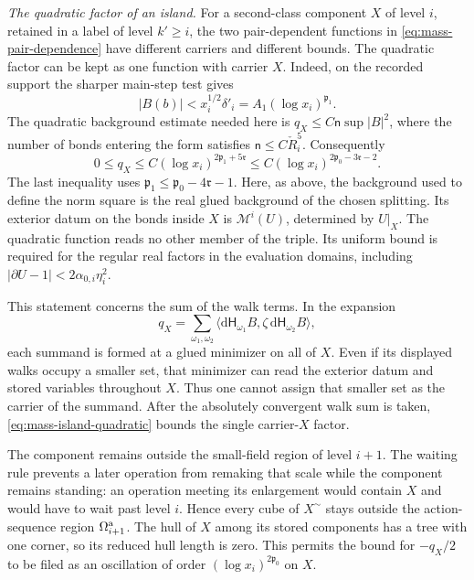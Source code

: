 \documentclass[11pt,letterpaper,reqno]{amsart}
\theoremstyle{definition}
\theoremstyle{remark}
\begin{document}
\emph{The quadratic factor of an island.}
For a second-class component \(X\) of level \(i\), retained in a
label of level \(k'\ge i\), the two pair-dependent functions in
\eqref{eq:mass-pair-dependence} have different carriers and different
bounds. The quadratic factor can be kept as one function with carrier
\(X\). Indeed, on the recorded support the sharper main-step test gives
\[
 |B(b)|<x_i^{1/2}\delta'_i
                  =A_1(\log x_i)^{\mathfrak p_1}.
\]
The quadratic background estimate needed here is
\(q_X\le C\mathsf n\sup|B|^2\), where the number of bonds entering
the form satisfies \(\mathsf n\le C\check R_i^5\). Consequently
\begin{equation}\label{eq:mass-island-quadratic}
 0\le q_X
 \le C(\log x_i)^{2\mathfrak p_1+5\mathfrak r}
 \le C(\log x_i)^{2\mathfrak p_0-3\mathfrak r-2}.
\end{equation}
The last inequality uses
\(\mathfrak p_1\le\mathfrak p_0-4\mathfrak r-1\).
Here, as above, the background used to define the norm square is
the real glued background of the chosen splitting. Its exterior
datum on the bonds inside \(X\) is \(\mathcal M^i(U)\), determined
by \(U|_X\). The quadratic function reads no other member of the
triple. Its uniform bound is required for the regular real factors
in the evaluation domains, including
\( |\partial U-1|<2\alpha_{0,i}\eta_i^2\).

This statement concerns the sum of the walk terms. In the expansion
\[
 q_X=\sum_{\omega_1,\omega_2}
 \langle \mathrm d\mathsf H_{\omega_1}B,
                 \zeta\,\mathrm d\mathsf H_{\omega_2}B\rangle,
\]
each summand is formed at a glued minimizer on all of \(X\).
Even if its displayed walks occupy a smaller set, that minimizer
can read the exterior datum and stored variables throughout \(X\).
Thus one cannot assign that smaller set as the carrier of the
summand. After the absolutely convergent walk sum is taken,
\eqref{eq:mass-island-quadratic} bounds the single carrier-\(X\)
factor.

The component remains outside the small-field region of level
\(i+1\). The waiting rule prevents a later operation from remaking
that scale while the component remains standing: an operation
meeting its enlargement would contain \(X\) and would have to wait
past level \(i\). Hence every cube of \(X^\sim\) stays outside the
action-sequence region \(\Omega^{\rm a}_{i+1}\). The hull of \(X\)
among its stored components has a tree with one corner, so its
reduced hull length is zero. This permits the bound for
\(-q_X/2\) to be filed as an oscillation of order
\((\log x_i)^{2\mathfrak p_0}\) on \(X\).
\end{document}
